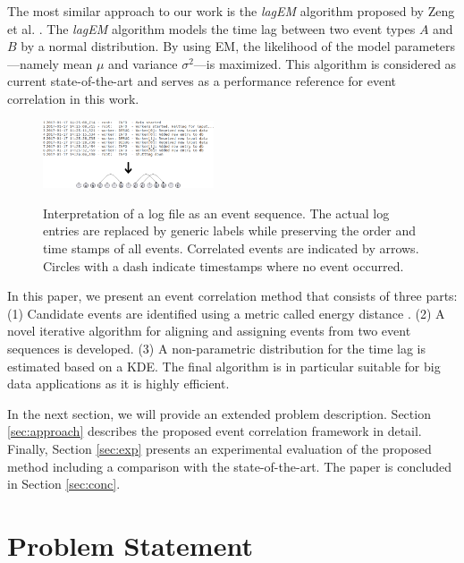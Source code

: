 \documentclass[conference]{IEEEtran}
\theoremstyle{examplestyle}
\begin{document}
The most similar approach to our work is the \textit{lagEM} algorithm proposed by Zeng et al. \cite{Zeng2015}. The \textit{lagEM} algorithm models the time lag between two event types \(A\) and \(B\) by a normal distribution. By using \ac{EM}, the likelihood of the model parameters---namely mean \(\mu\) and variance \(\sigma^2\)---is maximized. This algorithm is considered as current state-of-the-art and serves as a performance reference for event correlation in this work.

\begin{figure}[!tb]
	\centering
	{
	\includegraphics[width=0.45\textwidth]{images/overview.png}}
	\caption{Interpretation of a log file as an event sequence. The actual log entries are replaced by generic labels while preserving the order and time stamps of all events. Correlated events are indicated by arrows. Circles with a dash indicate timestamps where no event occurred. \vspace*{-0.4cm}}
	\label{fig:logToSequence}
\end{figure}

In this paper, we present an event correlation method that consists of three parts:
(1) Candidate events are identified using a metric called energy distance \cite{Rizzo2016}. (2) A novel iterative algorithm for aligning and assigning events from two event sequences is developed. (3) A non-parametric distribution for the time lag is estimated based on a \ac{KDE}.
The final algorithm is in particular suitable for big data applications as it is highly efficient. 

In the next section, we will provide an extended problem description.
Section \ref{sec:approach} describes the proposed event correlation framework in detail.
Finally, Section \ref{sec:exp} presents an experimental evaluation of the proposed method including a comparison with the state-of-the-art.
The paper is concluded in Section \ref{sec:conc}.


\section{Problem Statement}
\end{document}

